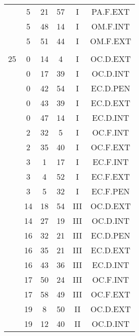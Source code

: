 \documentclass[12pt, a4paper]{article}
\begin{document}
\begin{multicols}{3}
{\begin{tabular}{c c c c c c}
	 	 	 	 & 5 & 21 & 57 & I & PA.F.EXT\\%
	 	 	 	 & 5 & 48 & 14 & I & OM.F.INT\\%
	 	 	 	 & 5 & 51 & 44 & I & OM.F.EXT\\%
	 	 	 	 & & & & & \\%
	 	 	 	25 & 0 & 14 & 4 & I & OC.D.EXT\\%
	 	 	 	 & 0 & 17 & 39 & I & OC.D.INT\\%
	 	 	 	 & 0 & 42 & 54 & I & EC.D.PEN\\%
	 	 	 	 & 0 & 43 & 39 & I & EC.D.EXT\\%
	 	 	 	 & 0 & 47 & 14 & I & EC.D.INT\\%
	 	 	 	 & 2 & 32 & 5 & I & OC.F.INT\\%
	 	 	 	 & 2 & 35 & 40 & I & OC.F.EXT\\%
	 	 	 	 & 3 & 1 & 17 & I & EC.F.INT\\%
	 	 	 	 & 3 & 4 & 52 & I & EC.F.EXT\\%
	 	 	 	 & 3 & 5 & 32 & I & EC.F.PEN\\%
	 	 	 	 & 14 & 18 & 54 & III & OC.D.EXT\\%
	 	 	 	 & 14 & 27 & 19 & III & OC.D.INT\\%
	 	 	 	 & 16 & 32 & 21 & III & EC.D.PEN\\%
	 	 	 	 & 16 & 35 & 21 & III & EC.D.EXT\\%
	 	 	 	 & 16 & 43 & 36 & III & EC.D.INT\\%
	 	 	 	 & 17 & 50 & 24 & III & OC.F.INT\\%
	 	 	 	 & 17 & 58 & 49 & III & OC.F.EXT\\%
	 	 	 	 & 19 & 8 & 50 & II & OC.D.EXT\\%
	 	 	 	 & 19 & 12 & 40 & II & OC.D.INT\\%

\end{tabular}}
\end{multicols}
\end{document}

